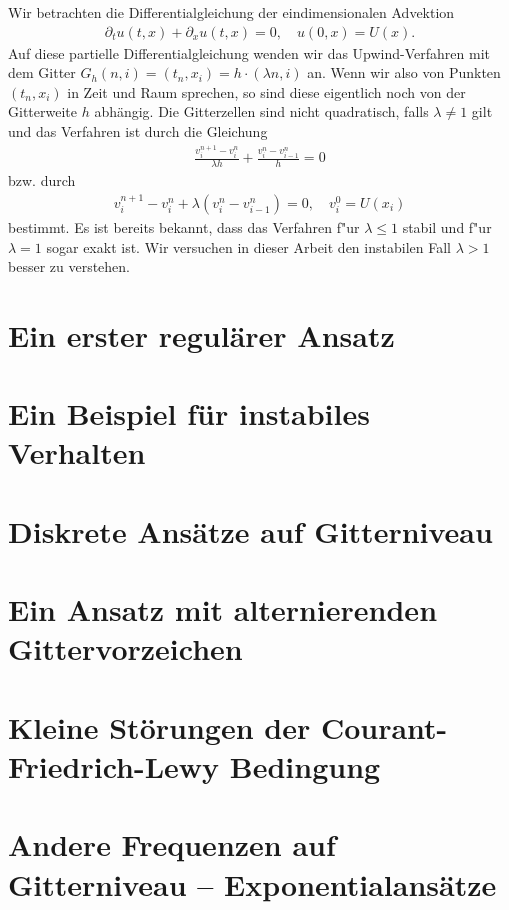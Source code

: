 
Wir betrachten die Differentialgleichung der eindimensionalen Advektion
\begin{align}\label{eq:adv:pde}
\partial_t u(t, x) + \partial_x u(t, x) = 0, \quad u(0, x) = U(x).
\end{align}
Auf diese partielle Differentialgleichung wenden wir das Upwind-Verfahren mit dem Gitter $G_h(n,i) = (t_n, x_i) = h \cdot (\lambda n, i)$ an.
Wenn wir also von Punkten $(t_n, x_i)$ in Zeit und Raum sprechen, so sind diese eigentlich noch von der Gitterweite $h$ abhängig. 
Die Gitterzellen sind nicht quadratisch, falls $\lambda \neq 1$ gilt und das Verfahren ist durch die Gleichung
\begin{align}\label{eq:adv:scheme_rechnung}
\frac {v^{n+1}_i - v^n_i} {\lambda h} + \frac {v^n_i - v^n_{i-1}} h = 0
\end{align}
bzw. durch
\begin{align}\label{eq:adv:scheme}
v^{n+1}_i - v^n_i + \lambda (v^n_i - v^n_{i-1}) = 0, \quad v^0_i = U(x_i)
\end{align}
bestimmt.
Es ist bereits bekannt, dass das Verfahren f"ur $\lambda \leq 1$ stabil und f"ur $\lambda = 1$ sogar exakt ist.
Wir versuchen in dieser Arbeit den instabilen Fall $\lambda > 1$ besser zu verstehen.

\section{Ein erster regulärer Ansatz}\label{sec:regulaer}



\section{Ein Beispiel für instabiles Verhalten}\label{sec:transport:beispiel}



\section {Diskrete Ansätze auf Gitterniveau} \label{sec:transport:diskret}



\section {Ein Ansatz mit alternierenden Gittervorzeichen}\label{sec:transport:osz}



\section{Kleine Störungen der Courant-Friedrich-Lewy Bedingung}\label{sec:transport:kleineta}



\section{Andere Frequenzen auf Gitterniveau -- Exponentialansätze}

